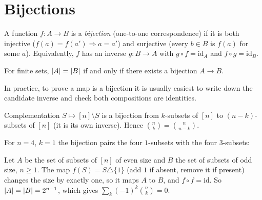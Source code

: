 \section{Bijections}

\begin{definition}[Bijection]
A function $f : A \to B$ is a \emph{bijection} (one-to-one correspondence) if it is both
injective ($f(a) = f(a') \Rightarrow a = a'$) and surjective (every $b \in B$ is $f(a)$ for some
$a$). Equivalently, $f$ has an inverse $g : B \to A$ with $g\circ f = \mathrm{id}_A$ and
$f \circ g = \mathrm{id}_B$.
\end{definition}

\begin{theorem}
For finite sets, $\left\lvert A \right\rvert = \left\lvert B \right\rvert$ if and only if there exists a bijection $A \to B$.
\end{theorem}

In practice, to prove a map is a bijection it is usually easiest to write down the candidate
inverse and check both compositions are identities.

\begin{example}
Complementation $S \mapsto [n] \setminus S$ is a bijection from $k$-subsets of $[n]$ to
$(n-k)$-subsets of $[n]$ (it is its own inverse). Hence $\binom{n}{k} = \binom{n}{n-k}$.
\end{example}

For $n = 4$, $k = 1$ the bijection pairs the four $1$-subsets with the four $3$-subsets:
\begin{center}
\end{center}

\begin{example}
Let $A$ be the set of subsets of $[n]$ of even size and $B$ the set of subsets of odd size,
$n \ge 1$. The map $f(S) = S \triangle \{1\}$ (add $1$ if absent, remove it if present) changes
the size by exactly one, so it maps $A$ to $B$, and $f\circ f = \mathrm{id}$. So $\left\lvert A \right\rvert = \left\lvert B \right\rvert
= 2^{n-1}$, which gives $\sum_k (-1)^k \binom{n}{k} = 0$.
\end{example}

